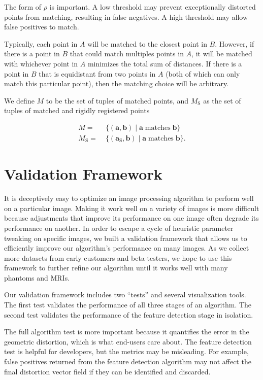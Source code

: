\documentclass[12pt]{article}
\begin{document}
The form of $\rho$ is important.  A low threshold may prevent exceptionally distorted points from matching, resulting in false negatives.  A high threshold may allow false positives to match.  

Typically, each point in $A$ will be matched to the closest point in $B$. However, if there is a point in $B$ that could match multiples points in $A$, it will be matched with whichever point in $A$ minimizes the total sum of distances.  If there is a point in $B$ that is equidistant from two points in $A$ (both of which can only match this particular point), then the matching choice will be arbitrary.

We define $M$ to be the set of tuples of matched points, and $M_\textrm{S}$ as the set of tuples of matched and rigidly registered points

\begin{align*}
M =& \; \{ (\mathbf{a}, \mathbf{b}) \; | \; \mathbf{a} \; \textrm{matches} \; \mathbf{b} \} \\
M_\textrm{S} =& \; \{ (\mathbf{a}_\textrm{S}, \mathbf{b}) \; | \; \mathbf{a} \; \textrm{matches} \; \mathbf{b} \}.
\end{align*}

\section{Validation Framework}

It is deceptively easy to optimize an image processing algorithm to perform well on a particular image. Making it work well on a variety of images is more difficult because adjustments that improve its performance on one image often degrade its performance on another.  In order to escape a cycle of heuristic parameter tweaking on specific images, we built a validation framework that allows us to efficiently improve our algorithm's performance on many images.  As we collect more datasets from early customers and beta-testers, we hope to use this framework to further refine our algorithm until it works well with many phantoms and MRIs.

Our validation framework includes two ``tests'' and several visualization tools.  The first test validates the performance of all three stages of an algorithm.  The second test validates the performance of the feature detection stage in isolation.

The full algorithm test is more important because it quantifies the error in the geometric distortion, which is what end-users care about.  The feature detection  test is helpful for developers, but the metrics may be misleading.  For example, false positives returned from the feature detection algorithm may not affect the final distortion vector field if they can be identified and discarded.
\end{document}
